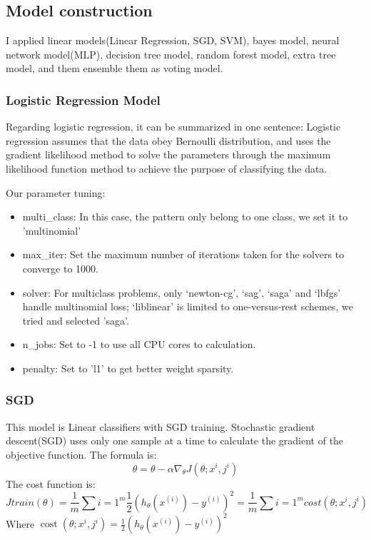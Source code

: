 \documentclass[11pt,en]{elegantpaper}
\begin{document}
\subsection{Model construction}
I applied linear models(Linear Regression, SGD, SVM), bayes model, neural network model(MLP), decision tree model, random forest model, extra tree model, and them ensemble them as voting model.
\subsubsection{Logistic Regression Model}
Regarding logistic regression, it can be summarized in one sentence: Logistic regression assumes that the data obey Bernoulli distribution, and uses the gradient likelihood method to solve the parameters through the maximum likelihood function method to achieve the purpose of classifying the data.

Our parameter tuning:
\begin{itemize}
	\item multi\_class: In this case, the pattern only belong to one class, we set it to 'multinomial'
	\item max\_iter: Set the maximum number of iterations taken for the solvers to converge to 1000.
	\item solver: For multiclass problems, only ‘newton-cg’, ‘sag’, ‘saga’ and ‘lbfgs’ handle multinomial loss; ‘liblinear’ is limited to one-versus-rest schemes, we tried and selected 'saga'.
	\item n\_jobs: Set to -1 to use all CPU cores to calculation.
	\item penalty: Set to 'l1' to get better weight sparsity.
\end{itemize}

\subsubsection{SGD}
This model is Linear classifiers with SGD training. Stochastic gradient descent(SGD) uses only one sample at a time to calculate the gradient of the objective function. The formula is:
$$\theta=\theta-\alpha \nabla_{\theta} J\left(\theta ; x^{i}, j^{i}\right)$$
The cost function is:
\begin{equation}
	J{train}(\theta)=\frac{1}{m}\sum{i=1}^{m}\frac{1}{2}(h_{\theta}(x^{(i)})-y^{(i)})^{2} = \frac{1}{m}\sum{i=1}^{m}cost(\theta;x^i,j^i)
\end{equation}
Where $\operatorname{cost}\left(\theta ; x^{i}, j^{i}\right)=\frac{1}{2}\left(h_{\theta}\left(x^{(i)}\right)-y^{(i)}\right)^{2}$
\end{document}
